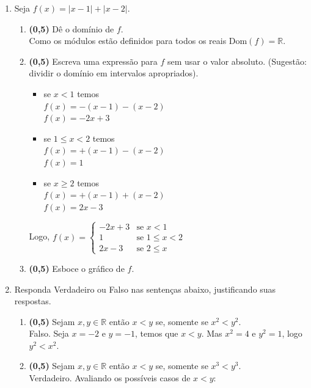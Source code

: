 \documentclass[a4paper,12pt]{article}
\newcommand{\RR}{\mathbb{R}}
\begin{document}
\begin{enumerate}
\vspace{5mm}

\item Seja $f(x)=|x-1|+|x-2|$.
\begin{enumerate}
\item {\bf (0,5)} Dê o domínio de $f$.\\
 Como os módulos estão definidos para todos os reais $\mathrm{Dom}(f) = \RR$.

\item {\bf (0,5)} Escreva uma expressão para $f$ sem usar o valor absoluto. (Sugestão: dividir o domínio em intervalos apropriados).\\
 \begin{itemize}
  \item se $x<1$ temos\\
  $f(x)=-(x-1)-(x-2)$\\
  $f(x)=-2x+3$\\
  \item se $1\leq x<2$ temos\\
  $f(x)=+(x-1)-(x-2)$\\
  $f(x)=1$
  \item se $x\geq2$ temos\\
  $f(x)=+(x-1)+(x-2)$\\
  $f(x)=2x-3$\\
  \end{itemize}
 Logo, $ f(x) =  \left\{
\begin{array}{ll}
      -2x+3 & \mbox{se }  x < 1 \\
      1 & \mbox{se } 1 \leq x < 2\\
      2x-3 & \mbox{se } 2 \leq x
\end{array} 
 \right. $\\

\item  {\bf (0,5)} Esboce o gráfico de $f$.
\end{enumerate}

\vspace{5mm}
\item Responda Verdadeiro ou Falso nas sentenças abaixo, justificando suas respostas.
\begin{enumerate}

\item{\bf (0,5)} Sejam $x,y\in \RR$ então $x<y$ se, somente se $x^2<y^2$.\\
 Falso. Seja $x=-2$ e $y=-1$, temos que $x<y$. Mas $x^2=4$ e $y^2=1$, logo $y^2<x^2$.
\vspace{3mm}
\item{\bf (0,5)} Sejam $x,y\in \RR$ então $x<y$ se, somente se $x^3<y^3$.\\
Verdadeiro.
Avaliando os possíveis casos de $x<y$:


\end{enumerate}
\end{enumerate}
\end{document}
